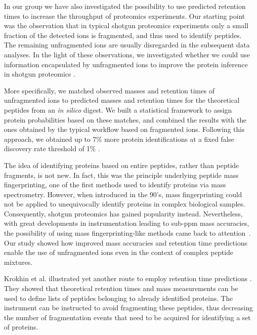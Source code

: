 \documentclass[a4paper]{article}
\begin{document}
In our group we have also investigated the possibility to use predicted retention times to increase the throughput of proteomics experiments. Our starting point was the observation that in typical shotgun proteomics experiments only a small fraction of the detected ions is
fragmented, and thus used to identify
peptides. The remaining unfragmented ions are usually disregarded in
the subsequent data analyses. In the light of these observations, we investigated whether we could use
information encapsulated by unfragmented ions to improve the protein
inference in shotgun proteomics \cite{mf}.



More specifically, we matched observed masses and retention times of
unfragmented ions to predicted masses and retention times for the
theoretical peptides from an {\it in silico} digest. We built a
statistical framework to assign protein probabilities based on these
matches, and combined the results with the ones obtained by the
typical workflow based on fragmented ions. Following this approach, we
obtained up to 7\% more protein identifications at a fixed false
discovery rate threshold of 1\% \cite{mf}.



The idea of identifying proteins based on entire peptides, rather than
peptide fragments, is not new. In fact, this was the principle
underlying peptide mass fingerprinting, one of the first methods used
to identify proteins via mass spectrometry. However, when introduced
in the 90's, mass fingerprinting could not be applied to unequivocally
identify proteins in complex biological samples. Consequently, shotgun
proteomics has gained popularity instead. Nevertheless, with great
developments in instrumentation leading to sub-ppm mass accuracies,
the possibility of using mass fingerprinting-like methods came back to
attention~\cite{iamt1}. Our study showed how improved mass accuracies
and retention time predictions enable the use of unfragmented ions
even in the context of complex peptide mixtures. 



Krokhin et al. illustrated yet another route to employ retention time
predictions \cite{krokhin200612, McQueen2012}. They showed that
theoretical retention times and mass measurements can be used to
define lists of peptides belonging to already identified proteins. The
instrument can be instructed to avoid fragmenting these peptides, thus
decreasing the number of fragmentation events that need to be acquired
for identifying a set of proteins.
\end{document}
